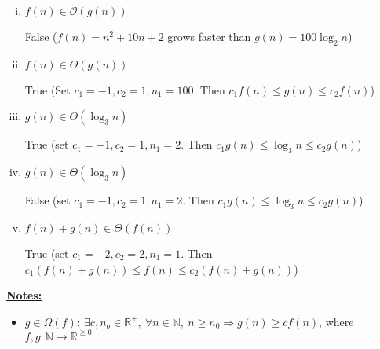 \documentclass[12pt]{article}
\begin{document}
\begin{enumerate}[1.]
\begin{enumerate}[a)]
\begin{enumerate}[i.]
            \bigskip

            \item \underline{$f(n) \in \mathcal{O}(g(n))$}

            \bigskip

            False ($f(n) = n^2 + 10n + 2$ grows faster than $g(n) = 100 \log_2 n$)

            \bigskip

            \item \underline{$f(n) \in \Theta(g(n))$}

            \bigskip

            True (Set $c_1 = -1 , c_2 = 1, n_1 = 100$. Then $c_1f(n) \leq g(n) \leq c_2f(n)$)

            \bigskip

            \item \underline{$g(n) \in \Theta(\log_3 n)$}

            \bigskip

            True (set $c_1  = -1, c_2 = 1, n_1 = 2$. Then $c_1 g(n) \leq \log_3 n \leq c_2 g(n)$)

            \bigskip

            \item \underline{$g(n) \in \Theta(\log_3 n)$}

            \bigskip

            False (set $c_1  = -1, c_2 = 1, n_1 = 2$. Then $c_1 g(n) \leq \log_3 n \leq c_2 g(n)$)

            \bigskip

            \item \underline{$f(n) + g(n) \in \Theta(f(n))$}

            \bigskip

            True (set $c_1  = -2, c_2 = 2, n_1 = 1$. Then $c_1 (f(n) + g(n)) \leq f(n) \leq c_2 (f(n) + g(n))$)

            \bigskip

        \end{enumerate}

        \bigskip

        \underline{\textbf{Notes:}}

        \bigskip

        \begin{itemize}
            \item
            $g \in \Omega(f):\:\exists c,n_o \in \mathbb{R}^{+},\:\forall n \in
            \mathbb{N},\:n \geq n_0 \Rightarrow g(n) \geq cf(n)$, where $f,g:\mathbb{N} \to \mathbb{R}^{\geq 0}$


\end{itemize}
\end{enumerate}
\end{enumerate}
\end{document}
